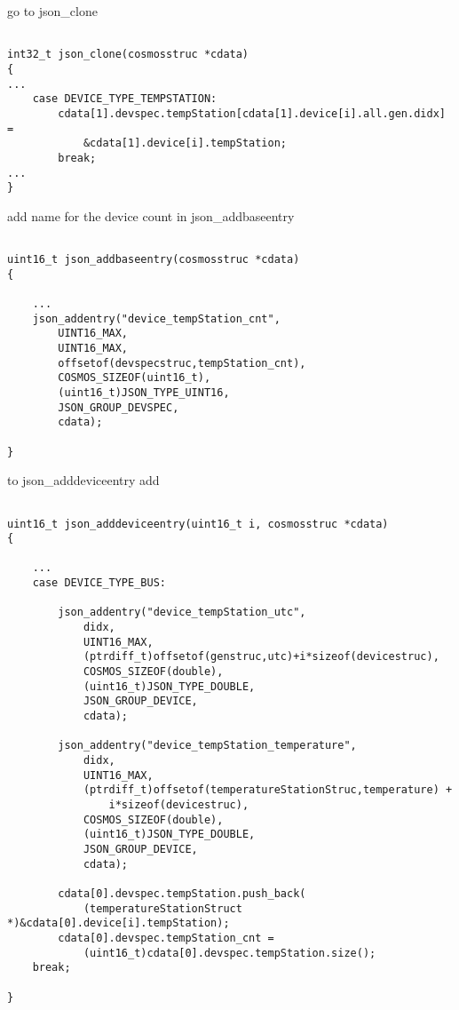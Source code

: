 go to json\_clone

\begin{lstlisting}

int32_t json_clone(cosmosstruc *cdata)
{
...
	case DEVICE_TYPE_TEMPSTATION:
		cdata[1].devspec.tempStation[cdata[1].device[i].all.gen.didx] =
			&cdata[1].device[i].tempStation;
		break;
...
}

\end{lstlisting}

add name for the device count in json\_addbaseentry

\begin{lstlisting}

uint16_t json_addbaseentry(cosmosstruc *cdata)
{

	...
	json_addentry("device_tempStation_cnt", 
		UINT16_MAX, 
		UINT16_MAX,
		offsetof(devspecstruc,tempStation_cnt), 
		COSMOS_SIZEOF(uint16_t), 
		(uint16_t)JSON_TYPE_UINT16,
		JSON_GROUP_DEVSPEC,
		cdata);

}

\end{lstlisting}


to json\_adddeviceentry add 

\begin{lstlisting}

uint16_t json_adddeviceentry(uint16_t i, cosmosstruc *cdata)
{

	...
	case DEVICE_TYPE_BUS:
	
		json_addentry("device_tempStation_utc",
			didx, 
			UINT16_MAX, 
			(ptrdiff_t)offsetof(genstruc,utc)+i*sizeof(devicestruc),
			COSMOS_SIZEOF(double), 
			(uint16_t)JSON_TYPE_DOUBLE,
			JSON_GROUP_DEVICE,
			cdata);

		json_addentry("device_tempStation_temperature",
			didx, 
			UINT16_MAX,
			(ptrdiff_t)offsetof(temperatureStationStruc,temperature) + 
				i*sizeof(devicestruc),
			COSMOS_SIZEOF(double), 
			(uint16_t)JSON_TYPE_DOUBLE,
			JSON_GROUP_DEVICE,
			cdata);
		
		cdata[0].devspec.tempStation.push_back(
			(temperatureStationStruct *)&cdata[0].device[i].tempStation);
		cdata[0].devspec.tempStation_cnt = 
			(uint16_t)cdata[0].devspec.tempStation.size();
	break;

}

\end{lstlisting}





